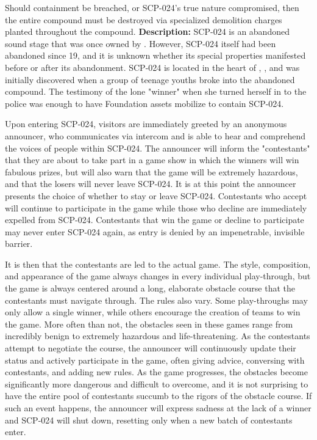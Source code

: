 Should containment be breached, or SCP-024's true nature compromised, then the entire compound must be destroyed via specialized demolition charges planted throughout the compound.
\newpage
\textbf{Description:} SCP-024 is an abandoned sound stage that was once owned by . However, SCP-024 itself had been abandoned since 19, and it is unknown whether its special properties manifested before or after its abandonment. SCP-024 is located in the heart of , , and was initially discovered when a group of teenage youths broke into the abandoned compound. The testimony of the lone "winner" when she turned herself in to the police was enough to have Foundation assets mobilize to contain SCP-024.

Upon entering SCP-024, visitors are immediately greeted by an anonymous announcer, who communicates via intercom and is able to hear and comprehend the voices of people within SCP-024. The announcer will inform the "contestants" that they are about to take part in a game show in which the winners will win fabulous prizes, but will also warn that the game will be extremely hazardous, and that the losers will never leave SCP-024. It is at this point the announcer presents the choice of whether to stay or leave SCP-024. Contestants who accept will continue to participate in the game while those who decline are immediately expelled from SCP-024. Contestants that win the game or decline to participate may never enter SCP-024 again, as entry is denied by an impenetrable, invisible barrier.

It is then that the contestants are led to the actual game. The style, composition, and appearance of the game always changes in every individual play-through, but the game is always centered around a long, elaborate obstacle course that the contestants must navigate through. The rules also vary. Some play-throughs may only allow a single winner, while others encourage the creation of teams to win the game. More often than not, the obstacles seen in these games range from incredibly benign to extremely hazardous and life-threatening. As the contestants attempt to negotiate the course, the announcer will continuously update their status and actively participate in the game, often giving advice, conversing with contestants, and adding new rules. As the game progresses, the obstacles become significantly more dangerous and difficult to overcome, and it is not surprising to have the entire pool of contestants succumb to the rigors of the obstacle course. If such an event happens, the announcer will express sadness at the lack of a winner and SCP-024 will shut down, resetting only when a new batch of contestants enter.


